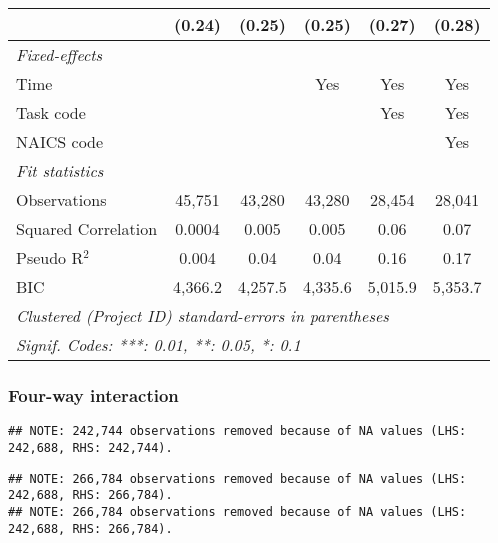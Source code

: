 \documentclass[
]{article}
\begin{document}
\begin{table}[htbp]
\begin{tabular}{lccccc}
                                                    & (0.24)        & (0.25)        & (0.25)     & (0.27)  & (0.28)\\
      \midrule \emph{Fixed-effects} &   &   &   &   &  \\
      Time                                          &               &               & Yes        & Yes     & Yes\\
      Task code                                     &               &               &            & Yes     & Yes\\
      NAICS code                                    &               &               &            &         & Yes\\
      \midrule \emph{Fit statistics} &   &   &   &   &  \\
      Observations                                  & 45,751        & 43,280        & 43,280     & 28,454  & 28,041\\
      Squared Correlation                           & 0.0004        & 0.005         & 0.005      & 0.06    & 0.07\\
      Pseudo R$^2$                                  & 0.004         & 0.04          & 0.04       & 0.16    & 0.17\\
      BIC                                           & 4,366.2       & 4,257.5       & 4,335.6    & 5,015.9 & 5,353.7\\
      \midrule\midrule\multicolumn{6}{l}{\emph{Clustered (Project ID) standard-errors in parentheses}}\\
      \multicolumn{6}{l}{\emph{Signif. Codes: ***: 0.01, **: 0.05, *: 0.1}}\\
   \end{tabular}
\end{table}

\hypertarget{four-way-interaction}{%
\subsubsection{Four-way interaction}\label{four-way-interaction}}

\begin{verbatim}
## NOTE: 242,744 observations removed because of NA values (LHS: 242,688, RHS: 242,744).
\end{verbatim}

\begin{verbatim}
## NOTE: 266,784 observations removed because of NA values (LHS: 242,688, RHS: 266,784).
## NOTE: 266,784 observations removed because of NA values (LHS: 242,688, RHS: 266,784).
\end{verbatim}
\end{document}
